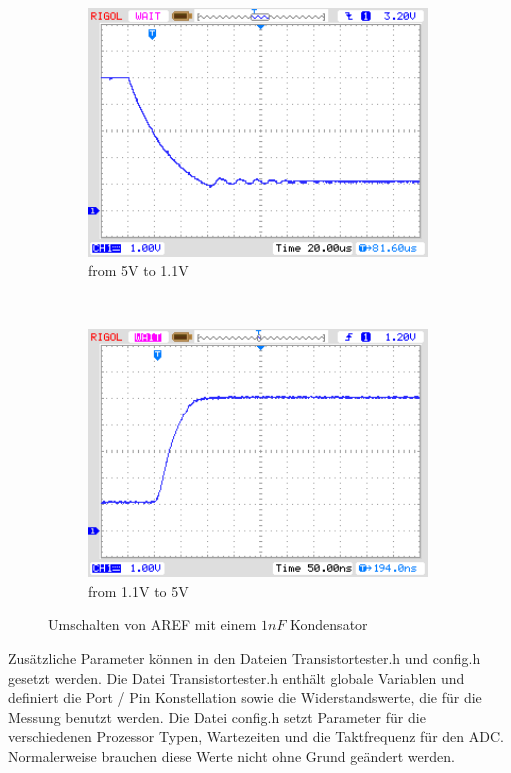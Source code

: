 \begin{description}
\end{description}

\begin{figure}[H]
  \begin{subfigure}[b]{9cm}
    \centering
    \includegraphics[width=9cm]{../PNG/AREF2_1V.png}
    \caption{from 5V to 1.1V }
    \label{pic:aref1}
  \end{subfigure}
  ~
  \begin{subfigure}[b]{9cm}
    \centering
    \includegraphics[width=9cm]{../PNG/AREF2VCC.png}
    \caption{from 1.1V to 5V}
    \label{pic:aref5}
  \end{subfigure}
  \caption{Umschalten von AREF mit einem \(1nF\) Kondensator}
\end{figure}


Zus\"atzliche Parameter k\"onnen in den Dateien Transistortester.h und config.h gesetzt werden.
Die Datei Transistortester.h enth\"alt globale Variablen und definiert die Port / Pin Konstellation
sowie die Widerstandswerte, die f\"ur die Messung benutzt werden.
Die Datei config.h setzt Parameter f\"ur die verschiedenen Prozessor Typen, Wartezeiten und die
Taktfrequenz f\"ur den ADC. Normalerweise brauchen diese Werte nicht ohne Grund ge\"andert werden.

